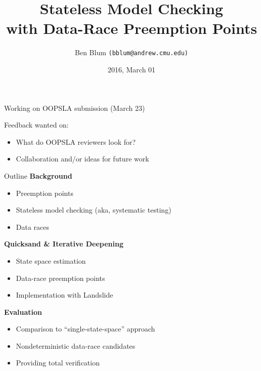 \documentclass[xcolor=dvipsnames]{beamer}
\title[Landslide]{{\bf Stateless Model Checking \\ with Data-Race Preemption Points}}
\author[Ben Blum]{Ben Blum \texttt{(bblum@andrew.cmu.edu)}}
\institute[]{Carnegie Mellon University - CALCM group seminar}
\date[]{2016, March 01}
\begin{document}
\renewcommand{\inserttotalframenumber}{39}
\normalem
\begin{frame}
	\titlepage
\end{frame}


\newcommand\linegap{\vspace{0.2in}}
\newcommand\breakslide[1]{\begin{frame}{} \begin{center} #1 \end{center} \end{frame}}

\begin{frame}{}
	Working on OOPSLA submission (March 23)
	\linegap

	Feedback wanted on:
	\begin{itemize}
		\item What do OOPSLA reviewers look for?
		\item Collaboration and/or ideas for future work
	\end{itemize}
\end{frame}

\begin{frame}{Outline}
	\textbf{Background}
	\begin{itemize}
		\item Preemption points
		\item Stateless model checking (aka, systematic testing)
		\item Data races
	\end{itemize}
	{\bf Quicksand \& Iterative Deepening}
	\begin{itemize}
		\item State space estimation
		\item Data-race preemption points
		\item Implementation with Landslide
	\end{itemize}
	{\bf Evaluation}
	\begin{itemize}
		\item Comparison to ``single-state-space'' approach
		\item Nondeterministic data-race candidates
		\item Providing total verification
	\end{itemize}
\end{frame}
\end{document}
